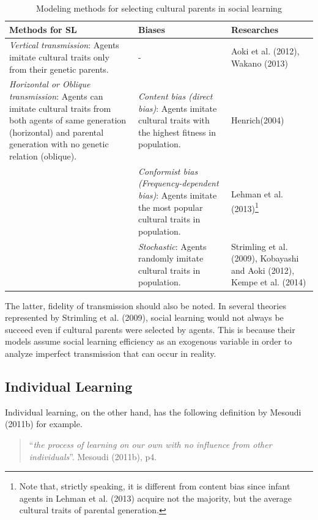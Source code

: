 \documentclass[a4paper, dvipdfmx]{article}
\begin{document}
\begin{table}[hbt]
    \centering
    \caption{Modeling methods for selecting cultural parents in social learning}
    \begin{tabularx}{.9\linewidth}{XXX}
        \toprule
        Methods for SL & Biases & Researches \\
        \midrule
        {\it Vertical transmission}: Agents imitate cultural traits only from their genetic parents. & - & Aoki et al. (2012), Wakano (2013) \\ \midrule
        {\it Horizontal or Oblique transmission}: Agents can imitate cultural traits from both agents of same generation (horizontal) and parental generation with no genetic relation (oblique). & {\it Content bias (direct bias)}: Agents imitate cultural traits with the highest fitness in population. & Henrich(2004) \\ \cmidrule{2-3}
                & {\it Conformist bias (Frequency-dependent bias)}: Agents imitate the most popular cultural traits in population. & Lehman et al. (2013)\footnote{Note that, strictly speaking, it is different from content bias since infant agents in Lehman et al. (2013) acquire not the majority, but the average cultural traits of parental generation.} \\ \cmidrule{2-3}
                & {\it Stochastic}: Agents randomly imitate cultural traits in population. & Strimling et al. (2009), Kobayashi and Aoki (2012), Kempe et al. (2014) \\
                \bottomrule
    \end{tabularx}
\end{table}

The latter, fidelity of transmission should also be noted. In several theories represented by Strimling et al. (2009), social learning would not always be succeed even if cultural parents were selected by agents. This is because their models assume social learning efficiency as an exogenous variable in order to analyze imperfect transmission that can occur in reality.


\subsection*{Individual Learning}
Individual learning, on the other hand, has the following definition by Mesoudi (2011b) for example.

\begin{quotation}
    “{\it the process of learning on our own with no influence from other individuals}”. Mesoudi (2011b), p4.
\end{quotation}
\end{document}
